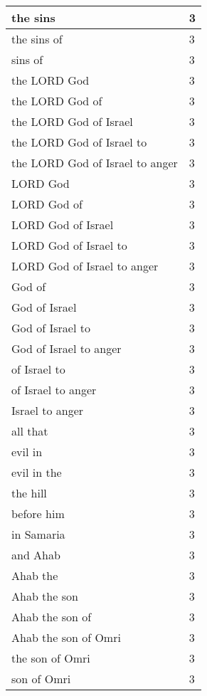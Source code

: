 \begin{center}
\begin{longtable}{|p{3.0in}|p{0.5in}|}
the sins & 3\\ \hline 
the sins of & 3\\ \hline 
sins of & 3\\ \hline 
the LORD God & 3\\ \hline 
the LORD God of & 3\\ \hline 
the LORD God of Israel & 3\\ \hline 
the LORD God of Israel to & 3\\ \hline 
the LORD God of Israel to anger & 3\\ \hline 
LORD God & 3\\ \hline 
LORD God of & 3\\ \hline 
LORD God of Israel & 3\\ \hline 
LORD God of Israel to & 3\\ \hline 
LORD God of Israel to anger & 3\\ \hline 
God of & 3\\ \hline 
God of Israel & 3\\ \hline 
God of Israel to & 3\\ \hline 
God of Israel to anger & 3\\ \hline 
of Israel to & 3\\ \hline 
of Israel to anger & 3\\ \hline 
Israel to anger & 3\\ \hline 
all that & 3\\ \hline 
evil in & 3\\ \hline 
evil in the & 3\\ \hline 
the hill & 3\\ \hline 
before him & 3\\ \hline 
in Samaria & 3\\ \hline 
and Ahab & 3\\ \hline 
Ahab the & 3\\ \hline 
Ahab the son & 3\\ \hline 
Ahab the son of & 3\\ \hline 
Ahab the son of Omri & 3\\ \hline 
the son of Omri & 3\\ \hline 
son of Omri & 3\\ \hline 
\end{longtable}
\end{center}





